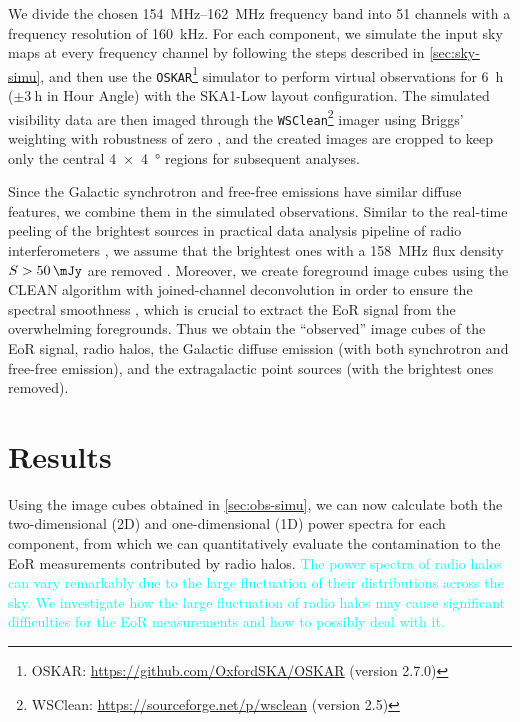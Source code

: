 \documentclass[modern]{aastex62}
\begin{document}
We divide the chosen \SIrange{154}{162}{\MHz} frequency band into 51
channels with a frequency resolution of \SI{160}{\kilo\hertz}.
For each component, we simulate the input sky maps at every frequency
channel by following the steps described in \autoref{sec:sky-simu},
and then use the \texttt{OSKAR}\footnote{%
  OSKAR: \url{https://github.com/OxfordSKA/OSKAR} (version 2.7.0)}
simulator \citep{mort2010} to perform virtual observations
for \SI{6}{\hour} ($\pm \SI{3}{\hour}$ in Hour Angle) with the
SKA1-Low layout configuration.
The simulated visibility data are then imaged through the
\texttt{WSClean}\footnote{%
  WSClean: \url{https://sourceforge.net/p/wsclean} (version 2.5)}
imager \citep{offringa2014} using Briggs' weighting with
robustness of zero \citep{briggs1995},
and the created images are cropped to keep only the central
\SI[product-units=repeat]{4 x 4}{\degree} regions for subsequent analyses.

Since the Galactic synchrotron and free-free emissions have similar
diffuse features, we combine them in the simulated observations.
Similar to the real-time peeling of the brightest sources in practical
data analysis pipeline of radio interferometers
\citep[e.g.,][]{mitchell2008,intema2009}, we assume that the brightest
ones with a \SI{158}{\MHz} flux density $S > \SI{50}{\mJy}$
are removed \citep[e.g.,][]{pindor2011}.
Moreover, we create foreground image cubes using the CLEAN algorithm
with joined-channel deconvolution in order to ensure the spectral
smoothness \citep{offringa2017}, which is crucial to extract the EoR
signal from the overwhelming foregrounds.
Thus we obtain the \enquote{observed} image cubes of the EoR signal,
radio halos, the Galactic diffuse emission (with both synchrotron and
free-free emission), and the extragalactic point sources (with the
brightest ones removed).


\section{Results}
\label{sec:results}

Using the image cubes obtained in \autoref{sec:obs-simu}, we can now
calculate both the two-dimensional (2D) and one-dimensional (1D) power
spectra for each component, from which we can quantitatively evaluate the
contamination to the EoR measurements contributed by radio halos.
\textcolor{cyan}{%
The power spectra of radio halos can vary remarkably due to the large
fluctuation of their distributions across the sky.
We investigate how the large fluctuation of radio halos may cause
significant difficulties for the EoR measurements and how to possibly
deal with it.}
\end{document}
